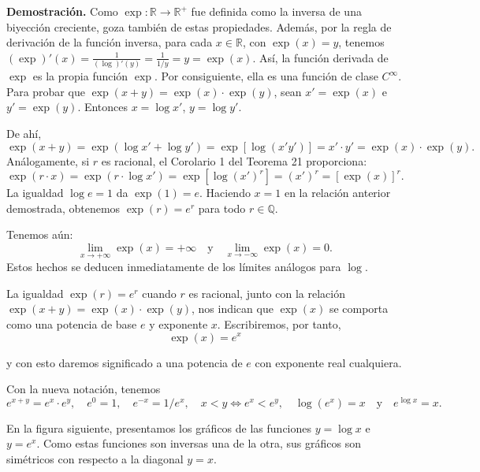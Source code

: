 \documentclass[12pt,oneside]{book}
\begin{document}
\textbf{Demostración.} Como \(\exp: \mathbb{R} \to \mathbb{R}^+\) fue definida como la inversa de una biyección creciente, goza también de estas propiedades. Además, por la regla de derivación de la función inversa, para cada \(x \in \mathbb{R}\), con \(\exp(x) = y\), tenemos \((\exp)'(x) = \frac{1}{(\log)'(y)} = \frac{1}{1/y} = y = \exp(x)\). Así, la función derivada de \(\exp\) es la propia función \(\exp\). Por consiguiente, ella es una función de clase \(C^\infty\). Para probar que \(\exp(x + y) = \exp(x) \cdot \exp(y)\), sean \(x' = \exp(x)\) e \(y' = \exp(y)\). Entonces \(x = \log x'\), \(y = \log y'\).

De ahí,
\[
\exp(x + y) = \exp(\log x' + \log y') = \exp[\log(x'y')] = x' \cdot y' = \exp(x) \cdot \exp(y).
\]
Análogamente, si \(r\) es racional, el Corolario 1 del Teorema 21 proporciona:
\[
\exp(r \cdot x) = \exp(r \cdot \log x') = \exp[\log(x')^r] = (x')^r = [\exp(x)]^r.
\]
La igualdad \(\log e = 1\) da \(\exp(1) = e\). Haciendo \(x = 1\) en la relación anterior demostrada, obtenemos \(\exp(r) = e^r\) para todo \(r \in \mathbb{Q}\).

Tenemos aún:
\[
\lim_{x \to +\infty} \exp(x) = +\infty \quad \text{y} \quad \lim_{x \to -\infty} \exp(x) = 0.
\]
Estos hechos se deducen inmediatamente de los límites análogos para \(\log\).

La igualdad \(\exp(r) = e^r\) cuando \(r\) es racional, junto con la relación \(\exp(x + y) = \exp(x) \cdot \exp(y)\), nos indican que \(\exp(x)\) se comporta como una potencia de base \(e\) y exponente \(x\). Escribiremos, por tanto,
\[
\exp(x) = e^x
\]

y con esto daremos significado a una potencia de \(e\) con exponente real cualquiera.

Con la nueva notación, tenemos
\[
e^{x+y} = e^x \cdot e^y, \quad e^0 = 1, \quad e^{-x} = 1/e^x, \quad x < y \iff e^x < e^y, \quad \log(e^x) = x \quad \text{y} \quad e^{\log x} = x.
\]

En la figura siguiente, presentamos los gráficos de las funciones \(y = \log x\) e \(y = e^x\). Como estas funciones son inversas una de la otra, sus gráficos son simétricos con respecto a la diagonal \(y = x\).

\begin{center}
\end{center}
\end{document}
